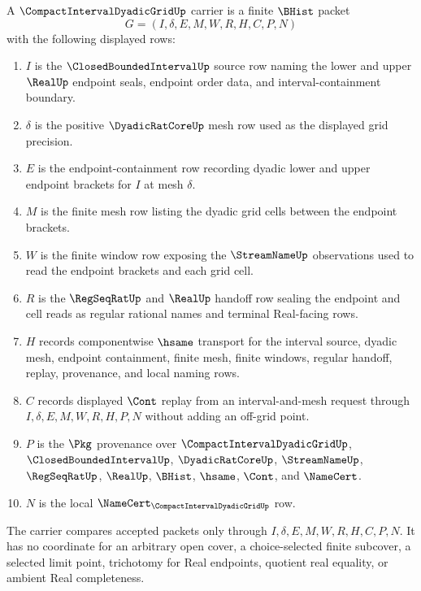 \begin{definition}
\label{def:compact-interval-dyadic-grid-carrier}
A $\CompactIntervalDyadicGridUp$ carrier is a finite $\BHist$ packet
$$
G=(I,\delta,E,M,W,R,H,C,P,N)
$$
with the following displayed rows:
\begin{enumerate}
\item $I$ is the $\ClosedBoundedIntervalUp$ source row naming the lower and upper $\RealUp$ endpoint seals, endpoint order data, and interval-containment boundary.
\item $\delta$ is the positive $\DyadicRatCoreUp$ mesh row used as the displayed grid precision.
\item $E$ is the endpoint-containment row recording dyadic lower and upper endpoint brackets for $I$ at mesh $\delta$.
\item $M$ is the finite mesh row listing the dyadic grid cells between the endpoint brackets.
\item $W$ is the finite window row exposing the $\StreamNameUp$ observations used to read the endpoint brackets and each grid cell.
\item $R$ is the $\RegSeqRatUp$ and $\RealUp$ handoff row sealing the endpoint and cell reads as regular rational names and terminal Real-facing rows.
\item $H$ records componentwise $\hsame$ transport for the interval source, dyadic mesh, endpoint containment, finite mesh, finite windows, regular handoff, replay, provenance, and local naming rows.
\item $C$ records displayed $\Cont$ replay from an interval-and-mesh request through $I,\delta,E,M,W,R,H,P,N$ without adding an off-grid point.
\item $P$ is the $\Pkg$ provenance over $\CompactIntervalDyadicGridUp$, $\ClosedBoundedIntervalUp$, $\DyadicRatCoreUp$, $\StreamNameUp$, $\RegSeqRatUp$, $\RealUp$, $\BHist$, $\hsame$, $\Cont$, and $\NameCert$.
\item $N$ is the local $\NameCert_{\CompactIntervalDyadicGridUp}$ row.
\end{enumerate}
The carrier compares accepted packets only through $I,\delta,E,M,W,R,H,C,P,N$. It has no coordinate for an arbitrary open cover, a choice-selected finite subcover, a selected limit point, trichotomy for Real endpoints, quotient real equality, or ambient Real completeness.
\end{definition}

